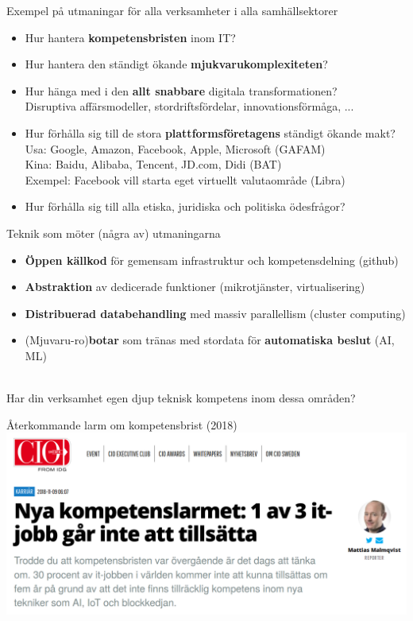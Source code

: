\documentclass[aspectratio=169]{beamer}
\newenvironment{Slide}[1]%
  {\begin{frame}[environment=Slide]{#1}}
  {\end{frame}}%
\begin{document}
\begin{Slide}{Exempel på utmaningar för alla verksamheter i alla samhällsektorer}
  \begin{itemize}
    \item Hur hantera \textbf{kompetensbristen} inom IT?
    \item Hur hantera den ständigt ökande \textbf{mjukvarukomplexiteten}?
    \item Hur hänga med i den \textbf{allt snabbare} digitala transformationen? \\ Disruptiva affärsmodeller, stordriftsfördelar, innovationsförmåga, ... 
    \item Hur förhålla sig till de stora \textbf{plattformsföretagens} ständigt ökande makt? \\ 
          Usa: Google, Amazon, Facebook, Apple, Microsoft \hfill(GAFAM)\\
          Kina: Baidu, Alibaba, Tencent, JD.com, Didi \hfill (BAT) \\
          Exempel: Facebook vill starta eget virtuellt valutaområde \hfill (Libra)
    \item Hur förhålla sig till alla etiska, juridiska och politiska ödesfrågor?
  \end{itemize}
\end{Slide}

\begin{Slide}{Teknik som möter (några av) utmaningarna}
  \begin{itemize}
    \item \textbf{Öppen källkod} för gemensam infrastruktur och kompetensdelning (github)
    \item \textbf{Abstraktion} av dedicerade funktioner (mikrotjänster, virtualisering)
    \item \textbf{Distribuerad databehandling} med massiv parallellism (cluster computing)
    \item (Mjuvaru-ro)\textbf{botar} som tränas med stordata för \textbf{automatiska beslut} (AI, ML)
  \end{itemize}
  ~\\Har din verksamhet egen djup teknisk kompetens inom dessa områden?
\end{Slide}



\begin{Slide}{Återkommande larm om kompetensbrist (2018)}
\includegraphics[height=0.75\textheight]{../img/kompetenslarm-cio}
\end{Slide}
\end{document}
